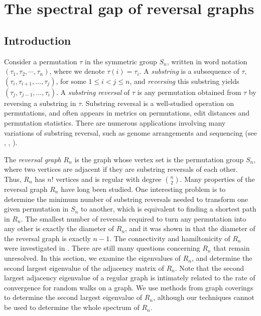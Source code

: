 
\chapter{The spectral gap of reversal graphs}

\section{Introduction}


Consider a permutation $\tau$ in the symmetric group $S_n$, written in 
word notation $(\tau_1, \tau_2, \cdots, \tau_n)$, where we denote $\tau(i) = \tau_i$.  
A \textit{substring} is a subsequence of $\tau$, $(\tau_i, \tau_{i+1}, \ldots, \tau_j)$,
for some $1 \leq i < j\leq n$, and \textit{reversing} this substring yields
$(\tau_j, \tau_{j-1}, \ldots, \tau_i)$.
A \textit{substring reversal} of $\tau$ is any permutation obtained from $\tau$
by reversing a substring in $\tau$. 
Substring reversal is a well-studied operation on permutations, and 
often  appears in metrics on permutations, edit distances
and permutation statistics. There are numerous applications involving many variations of substring reversal,
such as genome arrangements and sequencing  (see \cite{BafnaPevzner1996}, \cite{Hannenhalli1996}, \cite{KececiogluSankoff1995}). 

The \textit{reversal graph} $R_n$ is the graph whose vertex set is the permutation group $S_n$, where
two vertices are adjacent if they are substring reversals of each other. Thus, $R_n$ has $n!$ vertices and is regular
with degree
$\binom {n} 2$.
Many properties of  the reversal graph $R_n$ have long been studied.
One interesting problem is to determine the minimum number of substring reversals needed to transform one
given permutation in $S_n$ to another, which is equivalent to finding 
a shortest path in $R_n$.  The smallest number of reversals required to turn any permutation into any other
is exactly the diameter of $R_n$, and 
it was shown in \cite{BafnaPevzner1996} that the diameter of 
the reversal graph is exactly $n-1$. The connectivity
and hamiltonicity of $R_n$ were investigated in \cite{LiMeng2008}. 
There are  still many questions concerning $R_n$ that remain unresolved. In this section, we examine
 the eigenvalues of  $R_n$, and determine the second largest eigenvalue of the adjacency matrix of $R_n$.
 Note that the second largest adjacency eigenvalue of a regular graph is intimately related to the
 rate of convergence for random walks on a graph. We use methods from graph coverings to determine
 the second largest eigenvalue of $R_n$, although our techniques cannot be used to determine
 the whole spectrum of $R_n$.



